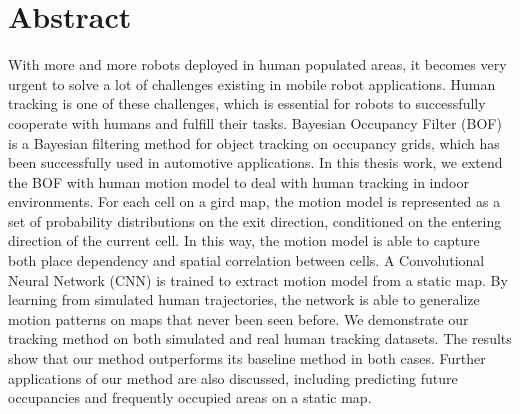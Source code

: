 \chapter*{Abstract}
\label{sec:abstract}

With more and more robots deployed in human populated areas, it becomes very urgent to solve a lot of challenges existing in mobile robot applications. Human tracking is one of these challenges, which is essential for robots to successfully cooperate with humans and fulfill their tasks. Bayesian Occupancy Filter (BOF) is a Bayesian filtering method for object tracking on occupancy grids, which has been successfully used in automotive applications. In this thesis work, we extend the BOF with human motion model to deal with human tracking in indoor environments. For each cell on a gird map, the motion model is represented as a set of probability distributions on the exit direction, conditioned on the entering direction of the current cell. In this way, the motion model is able to capture both place dependency and spatial correlation between cells. A Convolutional Neural Network (CNN) is trained to extract motion model from a static map. By learning from simulated human trajectories, the network is able to generalize motion patterns on maps that never been seen before. We demonstrate our tracking method on both simulated and real human tracking datasets. The results show that our method outperforms its baseline method in both cases. Further applications of our method are also discussed, including predicting future occupancies and frequently occupied areas on a static map.

